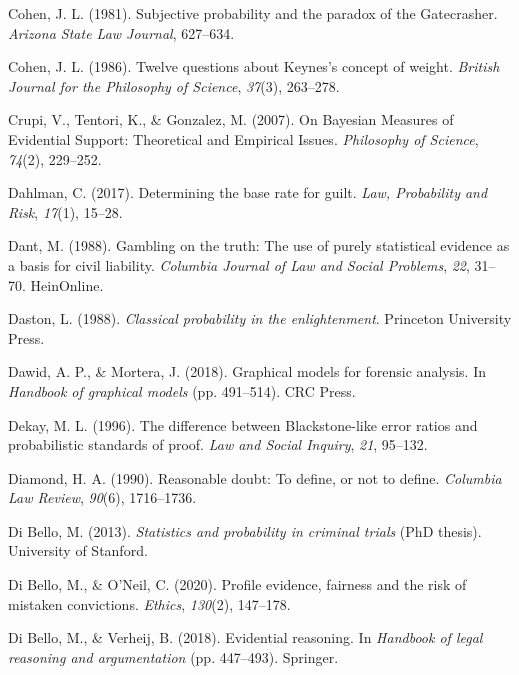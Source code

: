 \documentclass[11pt,dvipsnames,enabledeprecatedfontcommands]{scrartcl}
\begin{document}
\leavevmode\hypertarget{ref-Cohen81}{}%
Cohen, J. L. (1981). Subjective probability and the paradox of the
Gatecrasher. \emph{Arizona State Law Journal}, 627--634.

\leavevmode\hypertarget{ref-cohen86}{}%
Cohen, J. L. (1986). Twelve questions about Keynes's concept of weight.
\emph{British Journal for the Philosophy of Science}, \emph{37}(3),
263--278.

\leavevmode\hypertarget{ref-crupi2007BayesianMeasuresEvidential}{}%
Crupi, V., Tentori, K., \& Gonzalez, M. (2007). On Bayesian Measures of
Evidential Support: Theoretical and Empirical Issues. \emph{Philosophy
of Science}, \emph{74}(2), 229--252.

\leavevmode\hypertarget{ref-dahlman2017}{}%
Dahlman, C. (2017). Determining the base rate for guilt. \emph{Law,
Probability and Risk}, \emph{17}(1), 15--28.

\leavevmode\hypertarget{ref-dant1988gambling}{}%
Dant, M. (1988). Gambling on the truth: The use of purely statistical
evidence as a basis for civil liability. \emph{Columbia Journal of Law
and Social Problems}, \emph{22}, 31--70. HeinOnline.

\leavevmode\hypertarget{ref-daston1988}{}%
Daston, L. (1988). \emph{Classical probability in the enlightenment}.
Princeton University Press.

\leavevmode\hypertarget{ref-dawid2018graphical}{}%
Dawid, A. P., \& Mortera, J. (2018). Graphical models for forensic
analysis. In \emph{Handbook of graphical models} (pp. 491--514). CRC
Press.

\leavevmode\hypertarget{ref-Dekay1996}{}%
Dekay, M. L. (1996). The difference between Blackstone-like error ratios
and probabilistic standards of proof. \emph{Law and Social Inquiry},
\emph{21}, 95--132.

\leavevmode\hypertarget{ref-diamond90}{}%
Diamond, H. A. (1990). Reasonable doubt: To define, or not to define.
\emph{Columbia Law Review}, \emph{90}(6), 1716--1736.

\leavevmode\hypertarget{ref-di2013statistics}{}%
Di Bello, M. (2013). \emph{Statistics and probability in criminal
trials} (PhD thesis). University of Stanford.

\leavevmode\hypertarget{ref-DiBelloONeil2020}{}%
Di Bello, M., \& O'Neil, C. (2020). Profile evidence, fairness and the
risk of mistaken convictions. \emph{Ethics}, \emph{130}(2), 147--178.

\leavevmode\hypertarget{ref-di2018evidential}{}%
Di Bello, M., \& Verheij, B. (2018). Evidential reasoning. In
\emph{Handbook of legal reasoning and argumentation} (pp. 447--493).
Springer.
\end{document}
